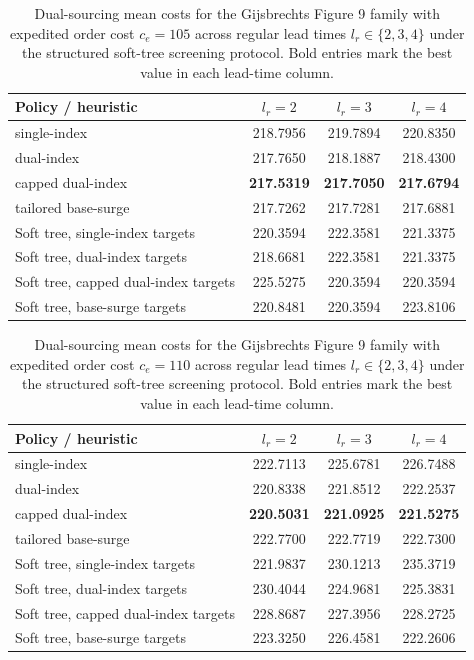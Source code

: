 \begin{table}[t]
\centering
\small
\caption{Dual-sourcing mean costs for the Gijsbrechts Figure 9 family with expedited order cost $c_e=105$ across regular lead times $l_r \in \{2,3,4\}$ under the structured soft-tree screening protocol. Bold entries mark the best value in each lead-time column.}
\label{tab:dual-sourcing-ce105}
\begin{tabular}{|l||c|c|c|}
\hline
Policy / heuristic & $l_r=2$ & $l_r=3$ & $l_r=4$ \\
\hline
single-index & 218.7956 & 219.7894 & 220.8350 \\
dual-index & 217.7650 & 218.1887 & 218.4300 \\
capped dual-index & \textbf{217.5319} & \textbf{217.7050} & \textbf{217.6794} \\
tailored base-surge & 217.7262 & 217.7281 & 217.6881 \\
\hline
Soft tree, single-index targets & 220.3594 & 222.3581 & 221.3375 \\
Soft tree, dual-index targets & 218.6681 & 222.3581 & 221.3375 \\
Soft tree, capped dual-index targets & 225.5275 & 220.3594 & 220.3594 \\
Soft tree, base-surge targets & 220.8481 & 220.3594 & 223.8106 \\
\hline
\end{tabular}
\end{table}

\begin{table}[t]
\centering
\small
\caption{Dual-sourcing mean costs for the Gijsbrechts Figure 9 family with expedited order cost $c_e=110$ across regular lead times $l_r \in \{2,3,4\}$ under the structured soft-tree screening protocol. Bold entries mark the best value in each lead-time column.}
\label{tab:dual-sourcing-ce110}
\begin{tabular}{|l||c|c|c|}
\hline
Policy / heuristic & $l_r=2$ & $l_r=3$ & $l_r=4$ \\
\hline
single-index & 222.7113 & 225.6781 & 226.7488 \\
dual-index & 220.8338 & 221.8512 & 222.2537 \\
capped dual-index & \textbf{220.5031} & \textbf{221.0925} & \textbf{221.5275} \\
tailored base-surge & 222.7700 & 222.7719 & 222.7300 \\
\hline
Soft tree, single-index targets & 221.9837 & 230.1213 & 235.3719 \\
Soft tree, dual-index targets & 230.4044 & 224.9681 & 225.3831 \\
Soft tree, capped dual-index targets & 228.8687 & 227.3956 & 228.2725 \\
Soft tree, base-surge targets & 223.3250 & 226.4581 & 222.2606 \\
\hline
\end{tabular}
\end{table}
